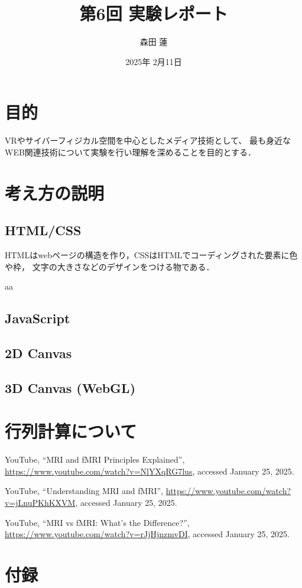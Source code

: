 \documentclass{jlreq}
\title{第6回 実験レポート}
\author{森田 蓮}
\date{2025年 2月11日}
\begin{document}
\maketitle

\section{目的}
VRやサイバーフィジカル空間を中心としたメディア技術として、
最も身近なWEB関連技術について実験を行い理解を深めることを目的とする．

\section{考え方の説明}
\subsection{HTML/CSS}
HTMLはwebページの構造を作り，CSSはHTMLでコーディングされた要素に色や枠，
文字の大きさなどのデザインをつける物である．

aa
\subsection{JavaScript}

\subsection{2D Canvas}

\subsection{3D Canvas (WebGL)}



\section{行列計算について}



\begin{thebibliography}{9}

YouTube, ``MRI and fMRI Principles Explained'', \url{https://www.youtube.com/watch?v=NlYXqRG7lus}, accessed January 25, 2025.

YouTube, ``Understanding MRI and fMRI'', \url{https://www.youtube.com/watch?v=jLnuPKhKXVM}, accessed January 25, 2025.

YouTube, ``MRI vs fMRI: What's the Difference?'', \url{https://www.youtube.com/watch?v=rJjHjnzmvDI}, accessed January 25, 2025.

\end{thebibliography}

\section*{付録}
\end{document}

